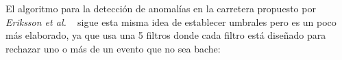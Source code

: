 


		El algoritmo para la detección de anomalías en la carretera propuesto por \emph{Eriksson et al.} ~ sigue
		esta misma idea de establecer umbrales pero es un poco más elaborado, ya que usa una 5 filtros donde cada filtro está diseñado
		para rechazar uno o más de un evento que no sea bache:\\

